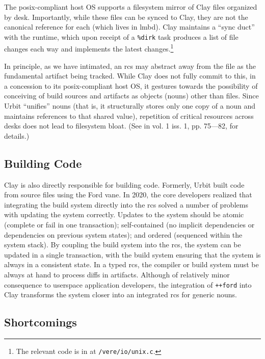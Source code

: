 \documentclass[twoside]{article}
\begin{document}
The {\sc posix}-compliant host OS supports a filesystem mirror of Clay files organized by desk.  Importantly, while these files can be synced to Clay, they are not the canonical reference for each (which lives in {\sc lmbd}).  Clay maintains a ``sync duct'' with the runtime, which upon receipt of a \lstinline[style=inlinecode]{%dirk} task produces a list of file changes each way and implements the latest changes.\footnote{The relevant code is in  at \lstinline[style=inlinecode]{/vere/io/unix.c}.}

In principle, as we have intimated, an {\sc rcs} may abstract away from the file as the fundamental artifact being tracked.  While Clay does not fully commit to this, in a concession to its {\sc posix}-compliant host OS, it gestures towards the possibility of conceiving of build sources and artifacts as objects (nouns) other than files.  Since Urbit ``unifies'' nouns (that is, it structurally stores only one copy of a noun and maintains references to that shared value), repetition of critical resources across desks does not lead to filesystem bloat.  (See \citet{Blackman2024a} in  vol. 1 iss. 1, pp. 75—82, for details.)

\subsection{Building Code}

Clay is also directly responsible for building code.  Formerly, Urbit built code from source files using the Ford vane.  In 2020, the core developers realized that integrating the build system directly into the {\sc rcs} solved a number of problems with updating the system correctly.  Updates to the system should be atomic (complete or fail in one transaction); self-contained (no implicit dependencies or dependencies on previous system states); and ordered (sequenced within the system stack).  By coupling the build system into the {\sc rcs}, the system can be updated in a single transaction, with the build system ensuring that the system is always in a consistent state.  In a typed {\sc rcs}, the compiler or build system must be always at hand to process diffs in artifacts.  Although of relatively minor consequence to userspace application developers, the integration of \lstinline[style=inlinecode]{++ford} into Clay transforms the system closer into an integrated {\sc rcs} for generic nouns.

\subsection{Shortcomings}
\end{document}
